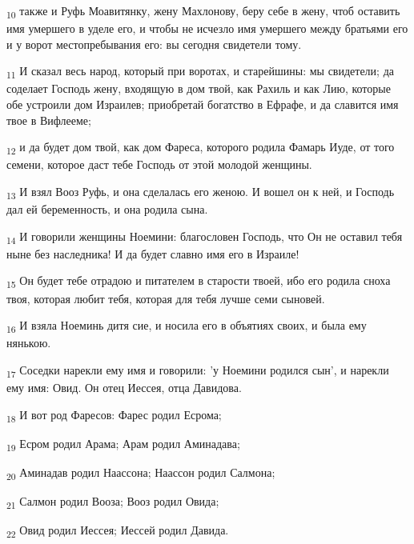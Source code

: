 \begin{tcolorbox}
\textsubscript{10} также и Руфь Моавитянку, жену Махлонову, беру себе в жену, чтоб оставить имя умершего в уделе его, и чтобы не исчезло имя умершего между братьями его и у ворот местопребывания его: вы сегодня свидетели тому.
\end{tcolorbox}
\begin{tcolorbox}
\textsubscript{11} И сказал весь народ, который при воротах, и старейшины: мы свидетели; да соделает Господь жену, входящую в дом твой, как Рахиль и как Лию, которые обе устроили дом Израилев; приобретай богатство в Ефрафе, и да славится имя твое в Вифлееме;
\end{tcolorbox}
\begin{tcolorbox}
\textsubscript{12} и да будет дом твой, как дом Фареса, которого родила Фамарь Иуде, от того семени, которое даст тебе Господь от этой молодой женщины.
\end{tcolorbox}
\begin{tcolorbox}
\textsubscript{13} И взял Вооз Руфь, и она сделалась его женою. И вошел он к ней, и Господь дал ей беременность, и она родила сына.
\end{tcolorbox}
\begin{tcolorbox}
\textsubscript{14} И говорили женщины Ноемини: благословен Господь, что Он не оставил тебя ныне без наследника! И да будет славно имя его в Израиле!
\end{tcolorbox}
\begin{tcolorbox}
\textsubscript{15} Он будет тебе отрадою и питателем в старости твоей, ибо его родила сноха твоя, которая любит тебя, которая для тебя лучше семи сыновей.
\end{tcolorbox}
\begin{tcolorbox}
\textsubscript{16} И взяла Ноеминь дитя сие, и носила его в объятиях своих, и была ему нянькою.
\end{tcolorbox}
\begin{tcolorbox}
\textsubscript{17} Соседки нарекли ему имя и говорили: 'у Ноемини родился сын', и нарекли ему имя: Овид. Он отец Иессея, отца Давидова.
\end{tcolorbox}
\begin{tcolorbox}
\textsubscript{18} И вот род Фаресов: Фарес родил Есрома;
\end{tcolorbox}
\begin{tcolorbox}
\textsubscript{19} Есром родил Арама; Арам родил Аминадава;
\end{tcolorbox}
\begin{tcolorbox}
\textsubscript{20} Аминадав родил Наассона; Наассон родил Салмона;
\end{tcolorbox}
\begin{tcolorbox}
\textsubscript{21} Салмон родил Вооза; Вооз родил Овида;
\end{tcolorbox}
\begin{tcolorbox}
\textsubscript{22} Овид родил Иессея; Иессей родил Давида.
\end{tcolorbox}

